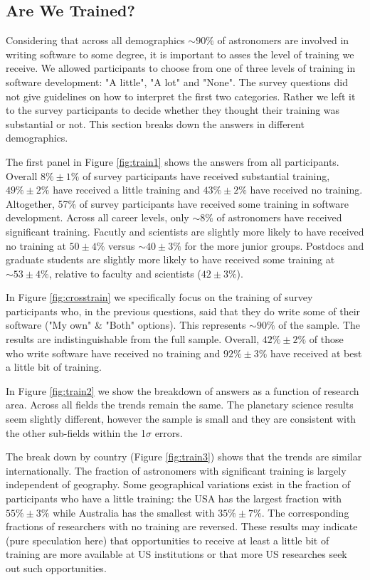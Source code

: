 \subsection{Are We Trained?}

Considering that across all demographics $\sim90\%$ of astronomers are involved in writing software to some degree, it is important to asses the level of training we receive. We allowed participants to choose from one of three levels of training in software development: "A little", "A lot" and "None". The survey questions did not give guidelines on how to interpret the first two categories. Rather we left it to the survey participants to decide whether they thought their training was substantial or not. This section breaks down the answers in different demographics. 

The first panel in Figure \ref{fig:train1} shows the answers from all participants. Overall $8\%\pm1\%$ of survey participants have received substantial training, $49\%\pm2\%$ have received a little training and $43\%\pm2\%$ have received no training. Altogether, 57\% of survey participants have received some training in software development. Across all career levels, only $\sim8\%$ of astronomers have received significant training. Facutly and scientists are slightly more likely to have received no training at $50\pm4\%$ versus $\sim40\pm3\%$ for the more junior groups. Postdocs and graduate students are slightly more likely to have received some training at $\sim53\pm4\%$, relative to faculty and scientists ($42\pm3\%$).

In Figure \ref{fig:crosstrain} we specifically focus on the training of survey participants who, in the previous questions, said that they do write some of their software ("My own" & "Both" options). This represents $\sim90\%$ of the sample. The results are indistinguishable from the full sample. Overall, $42\%\pm2\%$ of those who write software have received no training and $92\%\pm3\%$ have received at best a little bit of training.

In Figure \ref{fig:train2} we show the breakdown of answers as a function of research area. Across all fields the trends remain the same. The planetary science results seem slightly different, however the sample is small and they are consistent with the other sub-fields within the 1$\sigma$ errors. 

The break down by country (Figure \ref{fig:train3}) shows that the trends are similar internationally. The fraction of astronomers with significant training is largely independent of geography. Some geographical variations exist in the fraction of participants who have a little training: the USA has the largest fraction with $55\%\pm3\%$ while Australia has the smallest with $35\%\pm7\%$. The corresponding fractions of researchers with no training are reversed. These results may indicate (pure speculation here) that opportunities to receive at least a little bit of training are more available at US institutions or that more US researches seek out such opportunities. 

